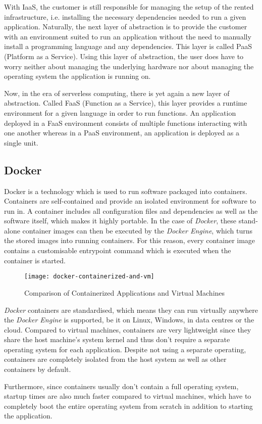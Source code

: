 With IaaS, the customer is still responsible for managing the setup of the rented infrastructure,
i.e. installing the necessary dependencies needed to run a given application. Naturally, the next
layer of abstraction is to provide the customer with an environment suited to run an application
without the need to manually install a programming language and any dependencies. This layer is
called PaaS (Platform as a Service). Using this layer of abstraction, the user does have to worry
neither about managing the underlying hardware nor about managing the operating system the
application is running on.

Now, in the era of serverless computing, there is yet again a new layer of abstraction. Called
FaaS (Function as a Service), this layer provides a runtime environment for a given language in
order to run functions. An application deployed in a FaaS environment consists of multiple
functions interacting with one another whereas in a PaaS environment, an application is deployed
as a single unit.

\subsection{Docker}

Docker is a technology which is used to run software packaged into containers. Containers are
self-contained and provide an isolated environment for software to run in. A container includes
all configuration files and dependencies as well as the software itself, which makes it highly
portable. In the case of \textit{Docker}, these stand-alone container images can then be executed
by the \textit{Docker Engine}, which turns the stored images into running containers. For this
reason, every container image contains a customisable entrypoint command which is executed when
the container is started.

\begin{figure}[H]
  \centering
  \texttt{[image: docker-containerized-and-vm]}
  \caption{Comparison of Containerized Applications and Virtual Machines \cite{docker-container}}
\end{figure}

\textit{Docker} containers are standardised, which means they can run virtually anywhere the
\textit{Docker Engine} is supported, be it on Linux, Windows, in data centres or the cloud.
Compared to virtual machines, containers are very lightweight since they share the host machine's
system kernel and thus don't require a separate operating system for each application. Despite
not using a separate operating, containers are completely isolated from the host system as well as
other containers by default.

Furthermore, since containers usually don't contain a full operating system, startup times are
also much faster compared to virtual machines, which have to completely boot the entire operating
system from scratch in addition to starting the application. \cite{docker-container}
